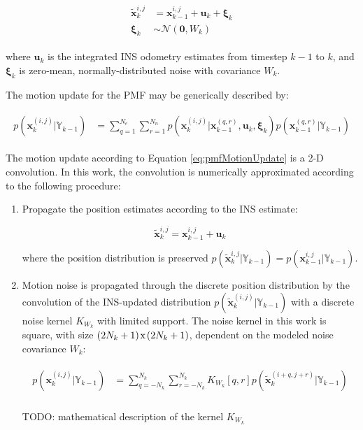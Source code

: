 \begin{align}
\begin{split}
\tilde{\mathbf{x}}_k^{i,j} &= \mathbf{x}_{k-1}^{i,j} + \mathbf{u}_k + \mathbf{\xi}_k \\
\mathbf{\xi}_k &\sim \mathcal{N}(\mathbf{0}, W_k) 
\end{split}
\end{align}

\noindent where $\mathbf{u}_k$ is the integrated INS odometry estimates from timestep $k-1$ to $k$, and $\mathbf{\xi}_k$ is zero-mean, normally-distributed noise with covariance $W_k$.

The motion update for the PMF may be generically described by:

\begin{align}
\begin{split}
p(\mathbf{x}_k^{(i,j)}|\mathbb{Y}_{k-1}) &= \sum_{q=1}^{N_e} \sum_{r=1}^{N_n} p(\mathbf{x}_k^{(i,j)} | \mathbf{x}_{k-1}^{(q,r)}, \mathbf{u}_k, \mathbf{\xi}_k) p(\mathbf{x}_{k-1}^{(q,r)}|\mathbb{Y}_{k-1})
\end{split}
\label{eq:pmfMotionUpdate}
\end{align}

The motion update according to Equation \ref{eq:pmfMotionUpdate} is a 2-D convolution.  In this work, the convolution is numerically approximated according to the following procedure:

\begin{enumerate}
\item Propagate the position estimates according to the INS estimate: 

\begin{equation}
\tilde{\mathbf{x}}_k^{i,j} = \mathbf{x}_{k-1}^{i,j} + \mathbf{u}_k
\end{equation}

\noindent where the position distribution is preserved $p(\tilde{\mathbf{x}}_k^{i,j} | \mathbb{Y}_{k-1}) = p(\mathbf{x}_{k-1}^{i,j} | \mathbb{Y}_{k-1})$.

\item Motion noise is propagated through the discrete position distribution by the convolution of the INS-updated distribution $p(\tilde{\mathbf{x}}_k ^{(i,j)}| \mathbb{Y}_{k-1})$ with a discrete noise kernel $K_{W_k}$ with limited support.  The noise kernel in this work is square, with size $(2N_k + 1) \hspace{0.3ex} \text{x} \hspace{0.3ex} (2N_k + 1)$, dependent on the modeled noise covariance $W_k$:

\begin{align}
\begin{split}
p(\mathbf{x}_k^{(i,j)} | \mathbb{Y}_{k-1}) &= \sum_{q=-N_k}^{N_k} \sum_{r=-N_k}^{N_k}  K_{W_k}[q,r] p(\tilde{\mathbf{x}}_k^{(i+q, j+r)} | \mathbb{Y}_{k-1}) \\
\end{split}
\label{eq:pmfTimeUpdate}
\end{align}

\noindent TODO: mathematical description of the kernel $K_{W_k}$

\end{enumerate}

